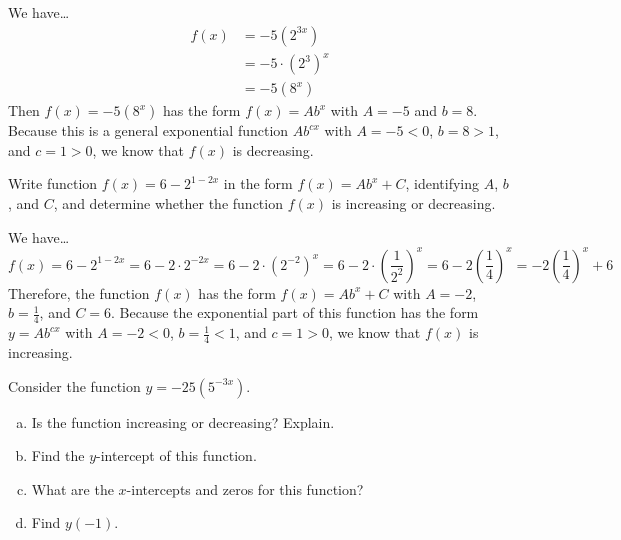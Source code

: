 \documentclass[11pt,letterpaper]{article}
\begin{document}
\sol We have\dots
	\[
	\begin{aligned}
	f(x)&= -5(2^{3x}) \\[0.3cm]
	&= -5 \cdot (2^3)^x \\[0.3cm]
	&= -5(8^x)
	\end{aligned}
	\] \pspace
Then $f(x)= -5(8^x)$ has the form $f(x)= Ab^x$ with $A= -5$ and $b= 8$. Because this is a general exponential function $Ab^{cx}$ with $A= -5 < 0$, $b= 8 > 1$, and $c= 1 > 0$, we know that $f(x)$ is decreasing. 



\newpage



 Write function $f(x)=  6 - 2^{1 - 2x}$ in the form $f(x)= Ab^x + C$, identifying $A$, $b$, and $C$, and determine whether the function $f(x)$ is increasing or decreasing. \pspace

\sol We have\dots
	\[
	f(x)=  6 - 2^{1 - 2x}= 6 - 2 \cdot 2^{-2x}= 6 - 2 \cdot (2^{-2})^x= 6 - 2 \cdot \left( \dfrac{1}{2^2} \right)^x= 6 - 2 \left( \dfrac{1}{4} \right)^x= - 2 \left( \dfrac{1}{4} \right)^x + 6
	\]
Therefore, the function $f(x)$ has the form $f(x)= Ab^x + C$ with $A= -2$, $b= \frac{1}{4}$, and $C= 6$. Because the exponential part of this function has the form $y= Ab^{cx}$ with $A= -2 < 0$, $b= \frac{1}{4} < 1$, and $c= 1 > 0$, we know that $f(x)$ is increasing. 



\newpage



 Consider the function $y= -25 (5^{-3x})$.
        \begin{enumerate}[(a)]
        \item Is the function increasing or decreasing? Explain.
        \item Find the $y$-intercept of this function.
        \item What are the $x$-intercepts and zeros for this function?
        \item Find $y(-1)$. 
        \end{enumerate} \pspace
\end{document}
